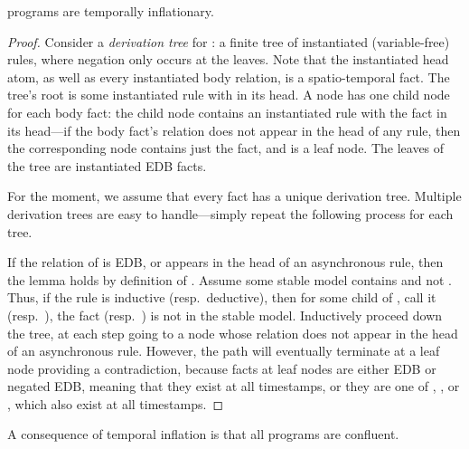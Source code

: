 \begin{lemma}
\label{lem:inflationary}
\slang programs are temporally inflationary.
\end{lemma}
\begin{proof}
Consider a {\em derivation tree} for : a finite tree of instantiated (variable-free) rules, where negation only occurs at the leaves.  Note that the instantiated head atom, as well as every instantiated body relation, is a spatio-temporal fact. 
The tree's root is some instantiated rule with  in its head.  A node has one child node for each body fact: the child node contains an instantiated rule with the fact in its head---if the body fact's relation does not appear in the head of any rule, then the corresponding node contains just the fact, and is a leaf node.  The leaves of the tree are instantiated EDB facts.

For the moment, we assume that every fact has a unique derivation tree.  Multiple derivation trees are easy to handle---simply repeat the following process for each tree.

If the relation of  is EDB, or appears in the head of an asynchronous rule, then the lemma holds by definition of \slang.  Assume some stable model contains  and not .  Thus, if the rule is inductive (resp.\ deductive), then for some child of , call it  (resp.\ ), the fact  (resp.\ ) is not in the stable model.  Inductively proceed down the tree, at each step going to a node whose relation does not appear in the head of an asynchronous rule.  However, the path will eventually terminate at a leaf node providing a contradiction, because facts at leaf nodes are either EDB or negated EDB, meaning that they exist at all timestamps, or they are one of , , or \dedalus{<}, which also exist at all timestamps.
\end{proof}

A consequence of temporal inflation is that all \slang programs are confluent.

